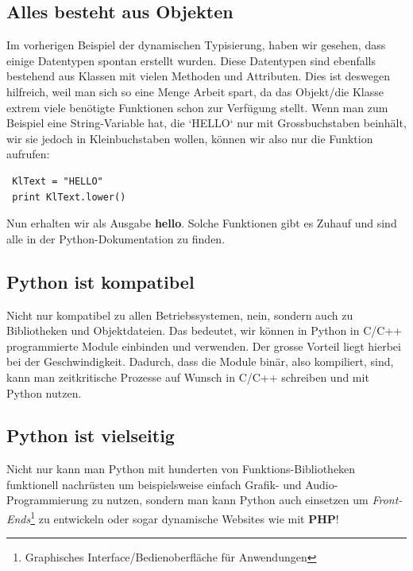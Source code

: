 \documentclass[b5paper,10pt,dvips,fleqn,titlepage,twoside]{book}
\begin{document}
\subsection{Alles besteht aus Objekten}
Im vorherigen Beispiel der dynamischen Typisierung, haben wir gesehen, dass einige Datentypen spontan erstellt wurden.
Diese Datentypen sind ebenfalls bestehend aus Klassen mit vielen Methoden und Attributen. Dies ist deswegen hilfreich, weil man sich so eine Menge Arbeit spart, da das Objekt/die Klasse extrem viele benötigte Funktionen schon zur Verfügung stellt.
Wenn man zum Beispiel eine String-Variable hat, die `HELLO` nur mit Grossbuchstaben beinhält, wir sie jedoch in Kleinbuchstaben wollen, können wir also nur die Funktion aufrufen:
\begin{lstlisting}
 KlText = "HELLO"
 print KlText.lower()
\end{lstlisting}
Nun erhalten wir als Ausgabe \textbf{hello}. Solche Funktionen gibt es Zuhauf und sind alle in der Python-Dokumentation zu finden.
\subsection{Python ist kompatibel}
Nicht nur kompatibel zu allen Betriebssystemen, nein, sondern auch zu Bibliotheken und Objektdateien. Das bedeutet, wir können in Python in C/C++ programmierte Module einbinden und verwenden. Der grosse Vorteil liegt hierbei bei der Geschwindigkeit. Dadurch, dass die Module binär, also kompiliert, sind, kann man zeitkritische Prozesse auf Wunsch in C/C++ schreiben und mit Python nutzen.
\subsection{Python ist vielseitig}
Nicht nur kann man Python mit hunderten von Funktions-Bibliotheken funktionell nachrüsten um beispielsweise einfach Grafik- und Audio-Programmierung zu nutzen, sondern man kann Python auch einsetzen um \emph{Front-Ends}\footnote{Graphisches Interface/Bedienoberfläche für Anwendungen} zu entwickeln oder sogar dynamische Websites wie mit \textbf{PHP}!
\end{document}
